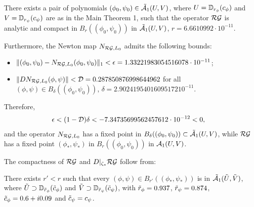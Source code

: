 \begin{thm}\label{mainthmA} $\phantom{aaa}$\\
There exists a pair of polynomials $(\phi_0,\psi_0) \in \tilde{\mathcal{A}}_1(U,V)$, where  $U=\mathbb{D}_{r_\phi}(c_\phi)$ and   $V=\mathbb{D}_{r_\psi}(c_\psi)$  are as in the Main Theorem 1, such that the operator $\mathcal{RG}$ is analytic and compact in $B_r((\phi_0,\psi_0))$ in $\tilde{\mathcal{A}}_1(U,V)$, $r=6.6610992 \cdot 10^{-11}$.

Furthermore, the Newton map $N_{\mathcal{RG},L_0}$ admits the following bounds:
\begin{itemize}
\item[$i)$] $\|(\phi_0,\psi_0)-N_{\mathcal{RG},L_0}(\phi_0,\psi_0)  \|_1 < \epsilon=1.33221983054516078 \cdot 10^{-11}$;
\item[$ii)$] $\| D N_{\mathcal{RG},L_0}(\phi,\psi)\| < \mathcal{D}=0.287850876998644962$ for all $(\phi,\psi) \in B_\delta(  (\phi_0,\psi_0)  )$, $\delta=2.90241954016095172 10^{-11}$.
\end{itemize}
Therefore,
$$\epsilon < (1-\mathcal{D}) \delta < -7.34735699562457612 \cdot 10^{-12}<0,$$
and the operator $N_{\mathcal{RG},L_0}$ has a fixed point in $B_\delta( (\phi_0,\psi_0) ) \subset \tilde{\mathcal{A}}_1(U,V)$, while $\mathcal{RG}$ has a fixed point  $(\phi_*,\psi_*)$ in  $B_r((\phi_0,\psi_0))$ in $\mathcal{A}_1(U,V)$.
\end{thm}

\noindent
The compactness of $\mathcal{RG}$ and $D|_{\zeta_*}\mathcal{RG}$ follow from:

\begin{prop}  \label{prop:renorm_compactness}
There exists $r'<r$ such that every  $(\phi, \psi) \in  B_{r'}((\phi_*,\psi_*))$  is in $\tilde{\mathcal{A}}_1(\tilde{U},\tilde{V})$, where $\tilde{U} \supset \mathbb{D}_{\tilde{r}_\phi} (\tilde{c}_\phi)$ and  $\tilde{V} \supset \mathbb{D}_{\tilde{r}_\psi}(\tilde{c}_\psi)$, with $\tilde{r}_\phi=0.937$, $\tilde{r}_\psi=0.874$,  $\tilde{c}_\phi=0.6+i 0.09$ and $\tilde{c}_\psi=c_\psi$. 
\end{prop}











